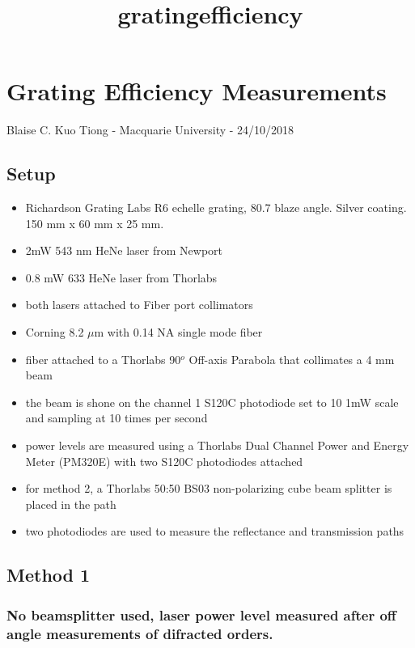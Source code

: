 \documentclass[11pt]{article}
\title{gratingefficiency}
\providecommand{\tightlist}{%
      \setlength{\itemsep}{0pt}\setlength{\parskip}{0pt}}
\begin{document}
    
    
    \maketitle
    
    

    
    \section{Grating Efficiency
Measurements}\label{grating-efficiency-measurements}

Blaise C. Kuo Tiong - Macquarie University - 24/10/2018

\subsection{Setup}\label{setup}

\begin{itemize}
\tightlist
\item
  Richardson Grating Labs R6 echelle grating, 80.7 blaze angle. Silver
  coating. 150 mm x 60 mm x 25 mm.
\item
  2mW 543 nm HeNe laser from Newport
\item
  0.8 mW 633 HeNe laser from Thorlabs
\item
  both lasers attached to Fiber port collimators
\item
  Corning 8.2 \(\mu\)m with 0.14 NA single mode fiber
\item
  fiber attached to a Thorlabs 90\(^o\) Off-axis Parabola that
  collimates a 4 mm beam
\item
  the beam is shone on the channel 1 S120C photodiode set to 10 1mW
  scale and sampling at 10 times per second
\item
  power levels are measured using a Thorlabs Dual Channel Power and
  Energy Meter (PM320E) with two S120C photodiodes attached
\item
  for method 2, a Thorlabs 50:50 BS03 non-polarizing cube beam splitter
  is placed in the path
\item
  two photodiodes are used to measure the reflectance and transmission
  paths
\end{itemize}

\subsection{Method 1}\label{method-1}

\subsubsection{No beamsplitter used, laser power level measured after
off angle measurements of difracted
orders.}\label{no-beamsplitter-used-laser-power-level-measured-after-off-angle-measurements-of-difracted-orders.}
\end{document}
